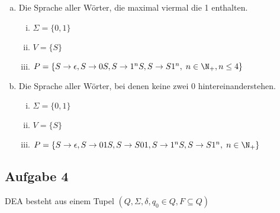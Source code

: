   \begin{enumerate}[a)]
    \item Die Sprache aller Wörter, die maximal viermal die 1 enthalten.

    \begin{enumerate}[i)]
      \item $\Sigma = \{ 0,1 \}$
      \item $V = \{S \} $
      \item $P = \{ S \to \epsilon, S \to 0S, S \to 1^n S, S \to S 1^n, \; n \in \N_{+}, n \leq 4 \}$
    \end{enumerate}

    \item Die Sprache aller Wörter, bei denen keine zwei 0 hintereinanderstehen.

    \begin{enumerate}[i)]
      \item $\Sigma = \{ 0,1 \}$
      \item $V = \{S \} $
      \item $P = \{ S \to \epsilon,
      S \to 01S, S \to S 01,
      S \to 1^{n} S,
      S \to S 1^{n},
      \; n \in \N_{+} \}$
    \end{enumerate}


  \end{enumerate}

  \subsection*{Aufgabe 4}

  DEA besteht aus einem Tupel $  (Q, \Sigma, \delta, q_0 \in Q, F \subseteq Q) $

